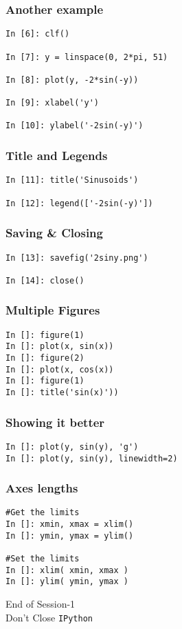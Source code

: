 \documentclass[14pt,compress]{beamer}
\newcommand{\typ}[1]{\lstinline{#1}}
\begin{document}
\begin{frame}[fragile]
\frametitle{Another example}
  \begin{lstlisting}
In [6]: clf()

In [7]: y = linspace(0, 2*pi, 51)

In [8]: plot(y, -2*sin(-y))

In [9]: xlabel('y')

In [10]: ylabel('-2sin(-y)')
  \end{lstlisting}
\end{frame}

\begin{frame}[fragile]
\frametitle{Title and Legends}
\begin{lstlisting}
In [11]: title('Sinusoids')

In [12]: legend(['-2sin(-y)'])
\end{lstlisting}
\end{frame}

\begin{frame}[fragile]
\frametitle{Saving \& Closing}
\begin{lstlisting}
In [13]: savefig('2siny.png')

In [14]: close()
\end{lstlisting}
\end{frame}

\begin{frame}[fragile]
\frametitle{Multiple Figures}
\begin{lstlisting}
In []: figure(1)
In []: plot(x, sin(x))
In []: figure(2)
In []: plot(x, cos(x))
In []: figure(1)
In []: title('sin(x)'))
\end{lstlisting}
\end{frame}

\begin{frame}[fragile]
\frametitle{Showing it better}
\begin{lstlisting}
In []: plot(y, sin(y), 'g')
In []: plot(y, sin(y), linewidth=2)  
\end{lstlisting}
\end{frame}

\begin{frame}[fragile]
\frametitle{Axes lengths}
  \begin{lstlisting}
#Get the limits
In []: xmin, xmax = xlim() 
In []: ymin, ymax = ylim() 

#Set the limits
In []: xlim( xmin, xmax ) 
In []: ylim( ymin, ymax ) 
  \end{lstlisting}
\end{frame}

\begin{frame}[fragile]
  \begin{center}
  End of Session-1\\
  \alert{Don't Close \typ{IPython}}
  \end{center}
\end{frame}
\end{document}
